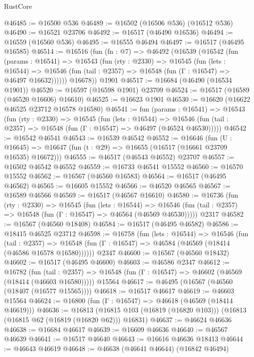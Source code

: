 \begin{lexlean}{RustCore}
\begin{coremodule}
@46485 := @16500 @536
@46489 := @16502 (@16506 @536) (@16512 @536)
@46490 := @16521 @23706
@46492 := @16517 (@46490 @16536)
@46494 := @16559 (@16560 @536)
@46495 := @16555 @46494
@46497 := @16517 (@46495 @16585)
@46514 := @16516
    (fun (fn : @7) =>
    @46492
      (@16539
        (@16542
          (fun (params : @16541) =>
          @16543
            (fun (rty : @2330) =>
            @16545
              (fun (lets : @16544) =>
              @16546 (fun (tail : @2357) => @16548 (fun (Γ : @16547) => @46497 @16632))))))
        @16678))
    @1901
@46517 := @16684 (@46490 (@16534 @1901))
@46520 := @16597 (@16598 @1901) @23709
@46524 := @16517 (@16589 (@46520 @16606) @16610)
@46525 := @16623 @1901
@46530 := @16620 (@16622 @46525 @23712 @16578 @16580)
@46541 := fun (params : @16541) =>
  @16543
    (fun (rty : @2330) =>
    @16545
      (fun (lets : @16544) =>
      @16546 (fun (tail : @2357) => @16548 (fun (Γ : @16547) => @46497 (@46524 @46530)))))
@46542 := @16542 @46541
@46543 := @16539 @46542
@46552 := @16646
    (fun (U : @16645) => @16647 (fun (t : @29) => @16655 (@16517 (@16661 @23709 @16535) @16672)))
@46555 := @46517 (@46543 @46552) @23707
@46557 := @16502 @46542 @46552
@46559 := @16733 @46541 @15552
@46560 := @16570 @15552
@46562 := @16567 (@46560 @16583)
@46564 := @16517 (@46495 @46562)
@46565 := @16605 @15552
@46566 := @46520 @46565
@46567 := @16589 @46566
@46569 := @16517 (@46567 @16610)
@46580 := @16736
    (fun (rty : @2330) =>
    @16545
      (fun (lets : @16544) =>
      @16546 (fun (tail : @2357) => @16548 (fun (Γ : @16547) => @46564 (@46569 @46530)))))
    @2317
@46582 := @16567 (@46560 @18408)
@46584 := @16517 (@46495 @46582)
@46586 := @18415 @46525 @23712
@46598 := @16758
    (fun (lets : @16544) =>
    @16546
      (fun (tail : @2357) =>
      @16548 (fun (Γ : @16547) => @46584 (@46569 (@18414 (@46586 @16578 @16580))))))
    @2347
@46600 := @16567 (@46560 @18432)
@46602 := @16517 (@46495 @46600)
@46603 := @46586 @2347
@46612 := @16782
    (fun (tail : @2357) => @16548 (fun (Γ : @16547) => @46602 (@46569 (@18414 (@46603 @16580)))))
    @15564
@46617 := @46495 (@16567 (@46560 (@18407 (@16577 @15565))))
@46618 := @16517 @46617
@46619 := @46603 @15564
@46624 := @16800 (fun (Γ : @16547) => @46618 (@46569 (@18414 @46619)))
@46636 := @16813
    (@16815 @103 (@16819 (@16820 @103)))
    (@16813 (@16815 @62 (@16819 (@16820 @62))) @16831)
@46637 := @46624 @46636
@46638 := @16684 @46617
@46639 := @16609 @46636
@46640 := @46567 @46639
@46641 := @16517 @46640
@46643 := @16616 @46636 @18413
@46644 := @46643 @46619
@46648 := @46638 (@46641 @46644) (@16842 @46494)

\end{coremodule}
\end{lexlean}

